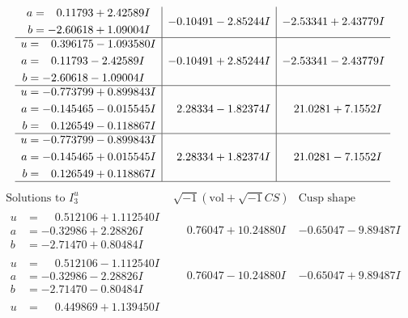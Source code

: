 \documentclass[1p]{elsarticle_modified}
\theoremstyle{definition}
\newcommand{\I}{\sqrt{-1}}
\begin{document}
$$\begin{array}{c|c|c}
\begin{aligned}
a &= \phantom{-}0.11793 + 2.42589 I \\
b &= -2.60618 + 1.09004 I\end{aligned}
 & -0.10491 - 2.85244 I & -2.53341 + 2.43779 I \\ \hline\begin{aligned}
u &= \phantom{-}0.396175 - 1.093580 I \\
a &= \phantom{-}0.11793 - 2.42589 I \\
b &= -2.60618 - 1.09004 I\end{aligned}
 & -0.10491 + 2.85244 I & -2.53341 - 2.43779 I \\ \hline\begin{aligned}
u &= -0.773799 + 0.899843 I \\
a &= -0.145465 - 0.015545 I \\
b &= \phantom{-}0.126549 - 0.118867 I\end{aligned}
 & \phantom{-}2.28334 - 1.82374 I & \phantom{-}21.0281 + 7.1552 I \\ \hline\begin{aligned}
u &= -0.773799 - 0.899843 I \\
a &= -0.145465 + 0.015545 I \\
b &= \phantom{-}0.126549 + 0.118867 I\end{aligned}
 & \phantom{-}2.28334 + 1.82374 I & \phantom{-}21.0281 - 7.1552 I\\
 \hline 
 \end{array}$$\newpage$$\begin{array}{c|c|c}  
\text{Solutions to }I^u_{3}& \I (\text{vol} + \sqrt{-1}CS) & \text{Cusp shape}\\
 \hline 
\begin{aligned}
u &= \phantom{-}0.512106 + 1.112540 I \\
a &= -0.32986 + 2.28826 I \\
b &= -2.71470 + 0.80484 I\end{aligned}
 & \phantom{-}0.76047 + 10.24880 I & -0.65047 - 9.89487 I \\ \hline\begin{aligned}
u &= \phantom{-}0.512106 - 1.112540 I \\
a &= -0.32986 - 2.28826 I \\
b &= -2.71470 - 0.80484 I\end{aligned}
 & \phantom{-}0.76047 - 10.24880 I & -0.65047 + 9.89487 I \\ \hline\begin{aligned}
u &= \phantom{-}0.449869 + 1.139450 I \\

\end{aligned}
\end{array}$$
\end{document}
